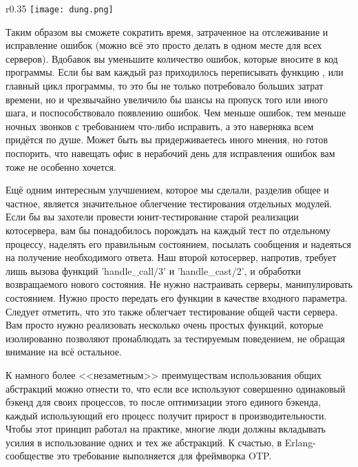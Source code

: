 \begin{wrapfigure}{r}{0.35\linewidth}
    \texttt{[image: dung.png]}
\end{wrapfigure}

Таким образом вы сможете сократить время, затраченное на отслеживание и исправление ошибок (можно всё это просто делать в одном месте для всех серверов).
Вдобавок вы уменьшите количество ошибок, которые вносите в код программы.
Если бы вам каждый раз приходилось переписывать функцию , или главный цикл программы, то это бы не только потребовало больших затрат времени, но и чрезвычайно увеличило бы шансы на пропуск того или иного шага, и поспособствовало появлению ошибок.
Чем меньше ошибок, тем меньше ночных звонков с требованием что\--либо исправить, а это наверняка всем придётся по душе.
Может быть вы придерживаетесь иного мнения, но готов поспорить, что навещать офис в нерабочий день для исправления ошибок вам тоже не особенно хочется.

Ещё одним интересным улучшением, которое мы сделали, разделив общее и частное, является значительное облегчение тестирования отдельных модулей.
Если бы вы захотели провести юнит\--тестирование старой реализации котосервера, вам бы понадобилось порождать на каждый тест по отдельному процессу, наделять его правильным состоянием, посылать сообщения и надеяться на получение необходимого ответа.
Наш второй котосервер, напротив, требует лишь вызова функций 'handle\_call/3' и 'handle\_cast/2', и обработки возвращаемого нового состояния.
Не нужно настраивать серверы, манипулировать состоянием.
Нужно просто передать его функции в качестве входного параметра.
Следует отметить, что это также облегчает тестирование общей части сервера.
Вам просто нужно реализовать несколько очень простых функций, которые изолированно позволяют пронаблюдать за тестируемым поведением, не обращая внимание на всё остальное.

К намного более <<незаметным>> преимуществам использования общих абстракций можно отнести то, что если все используют совершенно одинаковый бэкенд для своих процессов, то после оптимизации этого единого бэкенда, каждый использующий его процесс получит прирост в производительности.
Чтобы этот принцип работал на практике, многие люди должны вкладывать усилия в использование одних и тех же абстракций.
К счастью, в Erlang\--сообществе это требование выполняется для фреймворка OTP.

